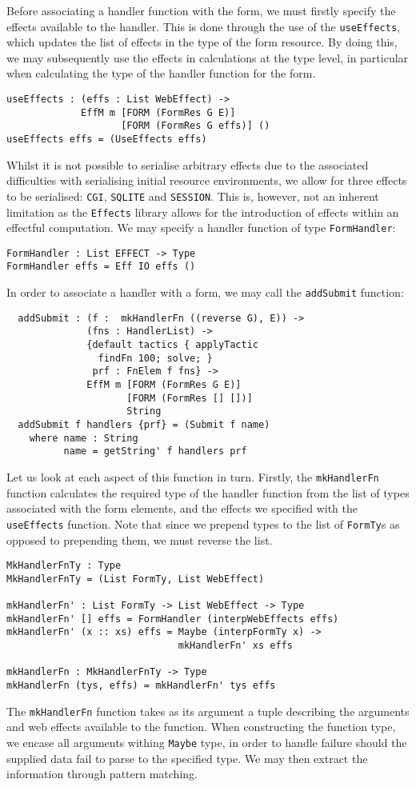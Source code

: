 \documentclass[preprint]{sigplanconf}
\begin{document}
Before associating a handler function with the form, we must firstly specify the effects available to the handler. This is done through the use of the \texttt{useEffects}, which updates the list of effects in the type of the form resource. By doing this, we may subsequently use the effects in calculations at the type level, in particular when calculating the type of the handler function for the form. 
{\small
\begin{verbatim}
useEffects : (effs : List WebEffect) ->
             EffM m [FORM (FormRes G E)] 
                    [FORM (FormRes G effs)] ()
useEffects effs = (UseEffects effs)
\end{verbatim}}
Whilst it is not possible to serialise arbitrary effects due to the associated difficulties with serialising initial resource environments, we allow for three effects to be serialised: \texttt{CGI}, \texttt{SQLITE} and \texttt{SESSION}. This is, however, not an inherent limitation as the \texttt{Effects} library allows for the introduction of effects within an effectful computation.
%
We may specify a handler function of type \texttt{FormHandler}:
\begin{verbatim}
FormHandler : List EFFECT -> Type
FormHandler effs = Eff IO effs ()
\end{verbatim}
In order to associate a handler with a form, we may call the \texttt{addSubmit} function:
%
\begin{verbatim}
  addSubmit : (f :  mkHandlerFn ((reverse G), E)) ->
              (fns : HandlerList) ->
              {default tactics { applyTactic 
                findFn 100; solve; }
               prf : FnElem f fns} ->
              EffM m [FORM (FormRes G E)]
                     [FORM (FormRes [] [])] 
                     String
  addSubmit f handlers {prf} = (Submit f name)
    where name : String
          name = getString' f handlers prf          
\end{verbatim}
%
Let us look at each aspect of this function in turn. Firstly, the \texttt{mkHandlerFn} function calculates the required type of the handler function from the list of types associated with the form elements, and the effects we specified with the \texttt{useEffects} function. Note that since we prepend types to the list of \texttt{FormTy}s as opposed to prepending them, we must reverse the list.
{\small
\begin{verbatim}
MkHandlerFnTy : Type
MkHandlerFnTy = (List FormTy, List WebEffect)

mkHandlerFn' : List FormTy -> List WebEffect -> Type
mkHandlerFn' [] effs = FormHandler (interpWebEffects effs) 
mkHandlerFn' (x :: xs) effs = Maybe (interpFormTy x) -> 
                              mkHandlerFn' xs effs 

mkHandlerFn : MkHandlerFnTy -> Type 
mkHandlerFn (tys, effs) = mkHandlerFn' tys effs 
\end{verbatim}
}
The \texttt{mkHandlerFn} function takes as its argument a tuple describing the arguments and web effects available to the function. When constructing the function type, we encase all arguments withing \texttt{Maybe} type, in order to handle failure should the supplied data fail to parse to the specified type. We may then extract the information through pattern matching.
\end{document}
